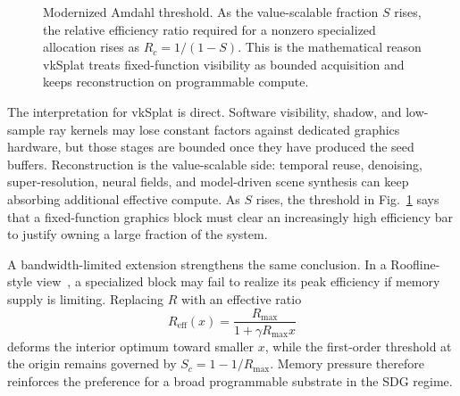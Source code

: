 \documentclass[10pt,journal]{IEEEtran}
\begin{document}
\begin{figure}[t]
\centering
{}
\caption{Modernized Amdahl threshold.  As the value-scalable fraction
$S$ rises, the relative efficiency ratio required for a nonzero
specialized allocation rises as $R_c=1/(1-S)$.  This is the mathematical
reason vkSplat treats fixed-function visibility as bounded acquisition
and keeps reconstruction on programmable compute.}
\label{fig:appendix-amdahl-threshold}
\end{figure}

The interpretation for vkSplat is direct.  Software visibility, shadow,
and low-sample ray kernels may lose constant factors against dedicated
graphics hardware, but those stages are bounded once they have produced
the seed buffers.  Reconstruction is the value-scalable side: temporal
reuse, denoising, super-resolution, neural fields, and model-driven scene
synthesis can keep absorbing additional effective compute.  As $S$ rises,
the threshold in Fig.~\ref{fig:appendix-amdahl-threshold} says that a
fixed-function graphics block must clear an increasingly high efficiency
bar to justify owning a large fraction of the system.

A bandwidth-limited extension strengthens the same conclusion.  In a
Roofline-style view~\cite{williams2009}, a specialized block may fail to
realize its peak efficiency if memory supply is limiting.  Replacing $R$
with an effective ratio
\begin{equation}
  R_{\mathrm{eff}}(x) =
  \frac{R_{\max}}{1 + \gamma R_{\max}x}
  \label{eq:appendix-reff}
\end{equation}
deforms the interior optimum toward smaller $x$, while the first-order
threshold at the origin remains governed by $S_c=1-1/R_{\max}$.  Memory
pressure therefore reinforces the preference for a broad programmable
substrate in the SDG regime.
\end{document}
